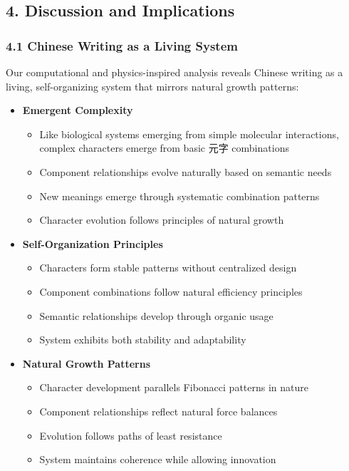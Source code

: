 \documentclass[
  11pt,
  letterpaper,
]{article}
\providecommand{\tightlist}{%
  \setlength{\itemsep}{0pt}\setlength{\parskip}{0pt}}
\begin{document}
\subsection{4. Discussion and
Implications}\label{discussion-and-implications}

\subsubsection{4.1 Chinese Writing as a Living
System}\label{chinese-writing-as-a-living-system}

Our computational and physics-inspired analysis reveals Chinese writing
as a living, self-organizing system that mirrors natural growth
patterns:

\begin{itemize}
\tightlist
\item
  \textbf{Emergent Complexity}

  \begin{itemize}
  \tightlist
  \item
    Like biological systems emerging from simple molecular interactions,
    complex characters emerge from basic 元字 combinations
  \item
    Component relationships evolve naturally based on semantic needs
  \item
    New meanings emerge through systematic combination patterns
  \item
    Character evolution follows principles of natural growth
  \end{itemize}
\item
  \textbf{Self-Organization Principles}

  \begin{itemize}
  \tightlist
  \item
    Characters form stable patterns without centralized design
  \item
    Component combinations follow natural efficiency principles
  \item
    Semantic relationships develop through organic usage
  \item
    System exhibits both stability and adaptability
  \end{itemize}
\item
  \textbf{Natural Growth Patterns}

  \begin{itemize}
  \tightlist
  \item
    Character development parallels Fibonacci patterns in nature
  \item
    Component relationships reflect natural force balances
  \item
    Evolution follows paths of least resistance
  \item
    System maintains coherence while allowing innovation
  \end{itemize}
\end{itemize}
\end{document}
